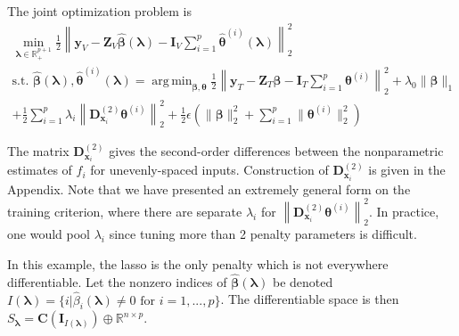 \documentclass[12pt,letterpaper]{article}
\DeclareMathOperator*{\argmin}{arg\,min}
\begin{document}
The joint optimization problem is
\begin{equation}
\begin{array}{c}
\min_{\boldsymbol\lambda \in \mathbb{R}^{p+1}_{+}} \frac{1}{2}
\left \|
\boldsymbol{y}_V
- \boldsymbol{Z}_V\hat{\boldsymbol{\beta}}(\boldsymbol{\lambda})
- \boldsymbol{I}_V \sum_{i=1}^p \hat{\boldsymbol{\theta}}^{(i)}(\boldsymbol{\lambda})
\right \|^2_2 \\
\text{s.t. }
\hat{\boldsymbol{\beta}}(\boldsymbol{\lambda}),
\hat{\boldsymbol{\theta}}^{(i)}(\boldsymbol{\lambda}) =
\argmin_{\boldsymbol{\beta}, \boldsymbol{\theta}}
\frac{1}{2} \left \|
\boldsymbol{y}_T
- \boldsymbol{Z}_T \boldsymbol{\beta}
- \boldsymbol{I}_T \sum_{i=1}^p \boldsymbol{\theta}^{(i)} \right \|^2_2
+ \lambda_0 \| \boldsymbol{\beta} \|_1 \\
+ \frac{1}{2} \sum_{i=1}^p \lambda_i \left \| \boldsymbol{D}^{(2)}_{\boldsymbol{x}_i} \boldsymbol{\theta}^{(i)} \right \|_2^2
+ \frac{1}{2} \epsilon \left( \| \boldsymbol{\beta} \|_2^2 + \sum_{i=1}^p \| \boldsymbol{\theta}^{(i)} \|_2^2 \right )
\end{array}
\label{aplmProblem}
\end{equation}

The matrix $\boldsymbol{D}^{(2)}_{\boldsymbol{x}_i}$ gives the second-order differences between the nonparametric estimates of $f_i$ for unevenly-spaced inputs. Construction of $\boldsymbol{D}^{(2)}_{\boldsymbol{x}_i}$ is given in the Appendix. Note that we have presented an extremely general form on the training criterion, where there are separate $\lambda_i$ for $\left \| \boldsymbol{D}^{(2)}_{\boldsymbol{x}_i} \boldsymbol{\theta}^{(i)} \right \|_2^2$. In practice, one would pool $\lambda_i$ since tuning more than 2 penalty parameters is difficult.

In this example, the lasso is the only penalty which is not everywhere differentiable. Let the nonzero indices of $\hat{\boldsymbol{\beta}}(\boldsymbol\lambda)$ be denoted $I(\boldsymbol\lambda) = \{i | \hat{\beta}_i(\boldsymbol\lambda) \ne 0 \text{ for } i=1,...,p \}$. The differentiable space is then $S_{\boldsymbol{\lambda}} = \boldsymbol C(\boldsymbol I_{I(\boldsymbol\lambda)}) \oplus \mathbb{R}^{n \times p}$.
\end{document}
